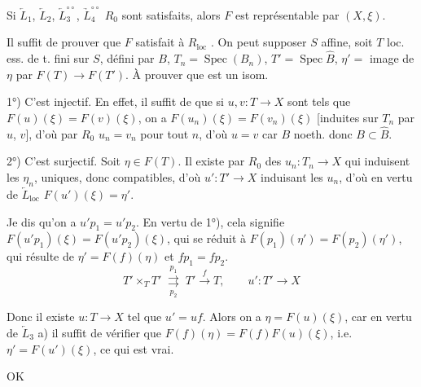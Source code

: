 \documentclass[11pt,a4paper]{article}
\begin{document}
Si $\underleftarrow{L}_1$, $\underleftarrow{L}_2$,
$\underleftarrow{L}_3^{\circ\circ}$, $\underrightarrow{L}_4^{\circ\circ}$
\struck{\ill{}} $R_0$ sont satisfaits, alors $F$ est représentable par
$(X, \xi)$.

Il suffit de prouver que $F$ satisfait à $R_{\mathrm{loc}}$ \struck{\ill{}}.
On peut supposer $S$ affine, soit $T$ loc. ess. de t. fini sur $S$, défini
par $B$, $T_n = \operatorname{Spec}(B_n)$, $T' = \operatorname{Spec} \hat{B}$,
$\eta' =$ image de $\eta$ par $F(T) \to F(T')$. À prouver que
\uncertain{$(*)$} est un isom.

1°) C'est injectif. En effet, il suffit de  que si
$u, v : T \to X$ sont tels que $F(u)(\xi) = F(v)(\xi)$, on a
$F(u_n)(\xi) = F(v_n)(\xi)$ [induites sur $T_n$ par $u$, $v$], d'où par
$R_0$ $u_n = v_n$ pour tout $n$, d'où $u = v$ car $B$ noeth. donc
$B \subset \hat{B}$.

2°) C'est surjectif.  Soit $\eta \in F(T)$. Il existe par
$R_0$ des $u_n : T_n \to X$ qui induisent les $\eta_n$, uniques, donc
compatibles, d'où \struck{\ill{}} $u' : T' \to X$  induisant
les $u_n$, d'où \struck{\ill{}} en vertu de $\underleftarrow{L}_{\mathrm{loc}}$
 $F(u')(\xi) = \eta'$.

Je dis qu'on a \struck{\ill{}} $u' p_1 = u' p_2$. En vertu de 1°), cela
\struck{\ill{}} signifie
$F(u' p_1)(\xi) = F(u' p_2)(\xi)$, qui se réduit à
$F(p_1)(\eta') = F(p_2)(\eta')$, qui résulte de $\eta' = F(f)(\eta)$ et
$f p_1 = f p_2$.
\[
  T' \times_T T' \;\overset{p_1}{\underset{p_2}{\rightrightarrows}}\; T'
  \xrightarrow{\ f\ } T ,
  \qquad u' : T' \to X
\]

Donc il existe $u : T \to X$ tel que $u' = u f$. Alors on a \struck{\ill{}}
$\eta = F(u)(\xi)$, car en vertu de $\underleftarrow{L}_3$ a) il suffit de
vérifier que $F(f)(\eta) = F(f) F(u)(\xi)$, i.e. $\eta' = F(u')(\xi)$, ce
qui est vrai.

OK
\end{document}
